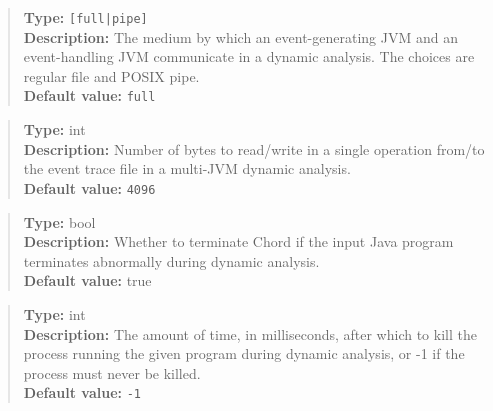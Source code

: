 \begin{quote}
{\bf Type:} {\tt [full|pipe]}  \\
{\bf Description:} The medium by which an event-generating JVM and an event-handling JVM communicate in a dynamic analysis.  The choices are regular file and POSIX pipe.  \\
{\bf Default value:} {\tt full} 
\end{quote}

\begin{quote}
{\bf Type:} int \\
{\bf Description:} Number of bytes to read/write in a single operation from/to the event trace file in a multi-JVM dynamic analysis. \\
{\bf Default value:} {\tt 4096}
\end{quote}

\begin{quote}
{\bf Type:} bool \\
{\bf Description:} Whether to terminate Chord if the input Java program terminates abnormally during dynamic analysis. \\
{\bf Default value:} true
\end{quote}

\begin{quote}
{\bf Type:} int  \\
{\bf Description:} The amount of time, in milliseconds, after which to kill the process running the given program during dynamic analysis, or -1 if the process must never be killed. \\
{\bf Default value:} {\tt -1}
\end{quote}

